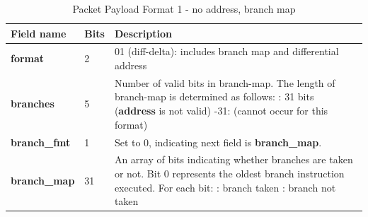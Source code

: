 \begin{table}[htp]
    \centering
    \caption{Packet Payload Format 1  - no address, branch map}
    \label{tab:te_inst0-1-noaddr-map}
    \begin{tabulary}{\textwidth}{|l|p{35mm}|p{80mm}|}
        \hline
        {\bf Field name} & {\bf Bits} & {\bf Description} \\
        \hline
        \textbf{format}	& 2	& 01 (diff-delta): includes branch map and differential address\\
        \hline
        \textbf{branches} & 5 & Number of valid bits in branch-map. The length of branch-map is determined as follows: :      31 bits (\textbf{address} is not valid) -31: 	(cannot occur for this format) \\
        \hline
        \textbf{branch\_fmt} & 1  & Set to 0, indicating next field is \textbf{branch\_map}. \\
        \hline
        \textbf{branch\_map} & 31 & 
                     An array of bits indicating whether branches are taken or not.\newline
        Bit 0 represents the oldest branch instruction executed.   For each bit: : branch taken : branch not taken \\
        \hline
    \end{tabulary}
\end{table}

